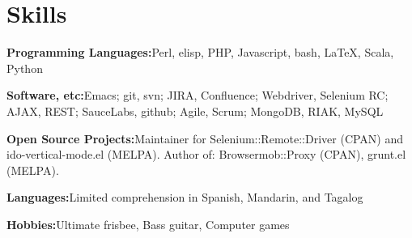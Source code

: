 \section{Skills}
%
\begin{position}
\item[] \textbf{Programming Languages:}\quad Perl, elisp, PHP, Javascript, bash, \LaTeX, Scala, Python%
\item[] \textbf{Software, etc:}\quad Emacs; git, svn; JIRA, Confluence; Webdriver, Selenium RC; AJAX, REST; SauceLabs, github; Agile, Scrum; MongoDB, RIAK, MySQL
\item[] \textbf{Open Source Projects:}\quad Maintainer for Selenium::Remote::Driver (CPAN) and ido-vertical-mode.el (MELPA). Author of: Browsermob::Proxy (CPAN), grunt.el (MELPA).
\item[] \textbf{Languages:}\quad Limited comprehension in Spanish, Mandarin, and Tagalog
\item[] \textbf{Hobbies:}\quad Ultimate frisbee, Bass guitar, Computer games
\end{position}
